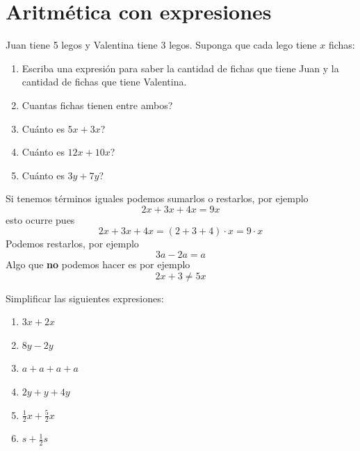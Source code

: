 \section{Aritmética con expresiones}\label{section:aritmeticaConExpresiones}

\begin{ejemplo}
	Juan tiene 5 legos y Valentina tiene 3 legos. Suponga que cada lego tiene $x$ fichas:
	\begin{enumerate}[label=\Alph*)]
		\item Escriba una expresión para saber la cantidad de fichas que tiene Juan y la cantidad de fichas que tiene Valentina.
		
		\item Cuantas fichas tienen entre ambos?
		
		\item Cuánto es $5x+3x$?
		
		\item Cuánto es $12x + 10x$?
		
		\item Cuánto es $3y + 7y$?
	\end{enumerate}
\end{ejemplo}

\begin{tcolorbox}[colback=red!5!white,colframe=red!75!black]
	Si tenemos términos iguales podemos sumarlos o restarlos, por ejemplo
	\[
	2x+3x+4x=9x
	\]
	esto ocurre pues 
	\[
	2x+3x+4x=(2+3+4)\cdot x = 9\cdot x
	\]
	Podemos restarlos, por ejemplo
	\[3a-2a=a\]
	Algo que \textbf{no} podemos hacer es por ejemplo
	\[2x+3\neq 5x\]
\end{tcolorbox}

\begin{exer}
	Simplificar las siguientes expresiones:
	\begin{multicols}{2}
		\begin{enumerate}[label=\Alph*)]
			\item $3x+2x$
			\item $8y-2y$
			\item $a+a+a+a$
			\item $2y+y+4y$
			\item $\frac{1}{2}x + \frac{5}{2}x$
			\item $s + \frac{1}{2}s$	
		\end{enumerate}
	\end{multicols}
\end{exer}


